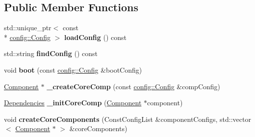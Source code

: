 \subsection*{Public Member Functions}
\begin{DoxyCompactItemize}
\item 
\hypertarget{classtheoria_1_1core_1_1Bootstrap_a02110d66b2f3e00c093dddd252889a68}{std\+::unique\+\_\+ptr$<$ const \\*
\hyperlink{classtheoria_1_1config_1_1Config}{config\+::\+Config} $>$ {\bfseries load\+Config} () const }\label{classtheoria_1_1core_1_1Bootstrap_a02110d66b2f3e00c093dddd252889a68}

\item 
\hypertarget{classtheoria_1_1core_1_1Bootstrap_acace5f80932017c9b7c4610f4f35fe28}{std\+::string {\bfseries find\+Config} () const }\label{classtheoria_1_1core_1_1Bootstrap_acace5f80932017c9b7c4610f4f35fe28}

\item 
\hypertarget{classtheoria_1_1core_1_1Bootstrap_acfcc189dd0c09ed9052917ef7ce24565}{void {\bfseries boot} (const \hyperlink{classtheoria_1_1config_1_1Config}{config\+::\+Config} \&boot\+Config)}\label{classtheoria_1_1core_1_1Bootstrap_acfcc189dd0c09ed9052917ef7ce24565}

\item 
\hypertarget{classtheoria_1_1core_1_1Bootstrap_a6154c7bce057f6fe41a98ab52b33b32e}{\hyperlink{classtheoria_1_1core_1_1Component}{Component} $\ast$ {\bfseries \+\_\+create\+Core\+Comp} (const \hyperlink{classtheoria_1_1config_1_1Config}{config\+::\+Config} \&comp\+Config)}\label{classtheoria_1_1core_1_1Bootstrap_a6154c7bce057f6fe41a98ab52b33b32e}

\item 
\hypertarget{classtheoria_1_1core_1_1Bootstrap_a0b53268afd49fabdba3fa2bd7705bbfa}{\hyperlink{classtheoria_1_1core_1_1Dependencies}{Dependencies} {\bfseries \+\_\+init\+Core\+Comp} (\hyperlink{classtheoria_1_1core_1_1Component}{Component} $\ast$component)}\label{classtheoria_1_1core_1_1Bootstrap_a0b53268afd49fabdba3fa2bd7705bbfa}

\item 
\hypertarget{classtheoria_1_1core_1_1Bootstrap_a8d0a601e2489274dda15ce990132d06f}{void {\bfseries create\+Core\+Components} (Const\+Config\+List \&component\+Configs, std\+::vector$<$ \hyperlink{classtheoria_1_1core_1_1Component}{Component} $\ast$ $>$ \&core\+Components)}\label{classtheoria_1_1core_1_1Bootstrap_a8d0a601e2489274dda15ce990132d06f}


\end{DoxyCompactItemize}
